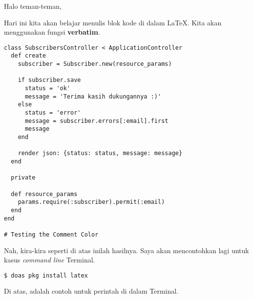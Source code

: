 \documentclass[12pt, times new roman]{article}
\begin{document}
Halo teman-teman,

Hari ini kita akan belajar menulis blok kode di dalam LaTeX. Kita akan menggunakan fungsi \textbf{verbatim}.

\begin{verbatim}
class SubscribersController < ApplicationController
  def create
    subscriber = Subscriber.new(resource_params)

    if subscriber.save
      status = 'ok'
      message = 'Terima kasih dukungannya :)'
    else
      status = 'error'
      message = subscriber.errors[:email].first
      message
    end

    render json: {status: status, message: message}
  end

  private

  def resource_params
    params.require(:subscriber).permit(:email)
  end
end

# Testing the Comment Color
\end{verbatim}

Nah, kira-kira seperti di atas inilah hasilnya. Saya akan mencontohkan lagi untuk kasus \textit{command line} Terminal.

\begin{verbatim}
$ doas pkg install latex
\end{verbatim}

Di atas, adalah contoh untuk perintah di dalam Terminal.
\end{document}
